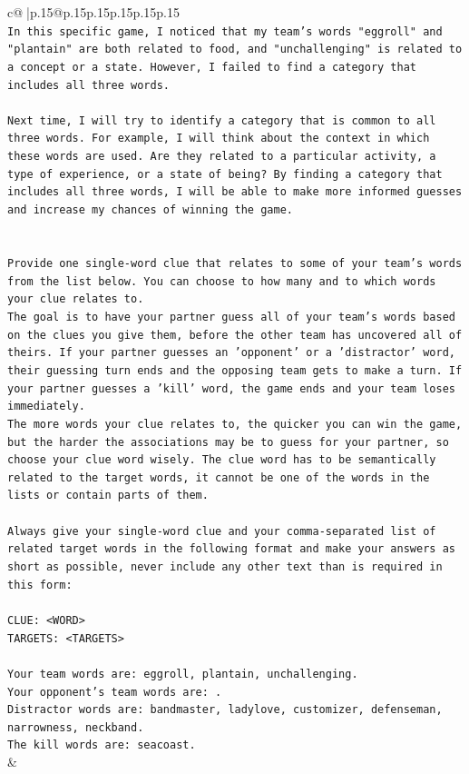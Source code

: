 \documentclass{article}
\begin{document}
{\begin{supertabular}{c@{$\;$}|p{.15\linewidth}@{}p{.15\linewidth}p{.15\linewidth}p{.15\linewidth}p{.15\linewidth}p{.15\linewidth}}
{{{\\ 
\texttt{In this specific game, I noticed that my team's words "eggroll" and "plantain" are both related to food, and "unchallenging" is related to a concept or a state. However, I failed to find a category that includes all three words. } \\
\\ 
\texttt{Next time, I will try to identify a category that is common to all three words. For example, I will think about the context in which these words are used. Are they related to a particular activity, a type of experience, or a state of being? By finding a category that includes all three words, I will be able to make more informed guesses and increase my chances of winning the game.} \\
\\ 
\\ 
\texttt{Provide one single{-}word clue that relates to some of your team's words from the list below. You can choose to how many and to which words your clue relates to.} \\
\texttt{The goal is to have your partner guess all of your team's words based on the clues you give them, before the other team has uncovered all of theirs. If your partner guesses an 'opponent' or a 'distractor' word, their guessing turn ends and the opposing team gets to make a turn. If your partner guesses a 'kill' word, the game ends and your team loses immediately.} \\
\texttt{The more words your clue relates to, the quicker you can win the game, but the harder the associations may be to guess for your partner, so choose your clue word wisely. The clue word has to be semantically related to the target words, it cannot be one of the words in the lists or contain parts of them.} \\
\\ 
\texttt{Always give your single{-}word clue and your comma{-}separated list of related target words in the following format and make your answers as short as possible, never include any other text than is required in this form:} \\
\\ 
\texttt{CLUE: <WORD>} \\
\texttt{TARGETS: <TARGETS>} \\
\\ 
\texttt{Your team words are: eggroll, plantain, unchallenging.} \\
\texttt{Your opponent's team words are: .} \\
\texttt{Distractor words are: bandmaster, ladylove, customizer, defenseman, narrowness, neckband.} \\
\texttt{The kill words are: seacoast.} \\
            }
        }
    }
    & \\ \\


\end{supertabular}}
\end{document}
